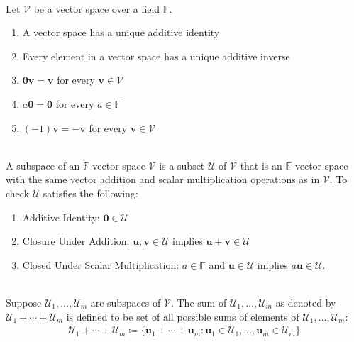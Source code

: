 \begin{remark} \\
Let $\mathcal{V}$ be a vector space over a field $\mathbb{F}$.
\begin{enumerate}[label=\roman*.]
\setlength{\itemsep}{0pt}
\item A vector space has a unique additive identity
\item Every element in a vector space has a unique additive inverse
\item $\mathbf{0} \mathbf{v} = \mathbf{v}$ for every $\mathbf{v} \in \mathcal{V}$
\item $a\mathbf{0} = \mathbf{0}$ for every $a \in \mathbb{F}$
\item $(-1)\mathbf{v} = -\mathbf{v}$ for every $\mathbf{v} \in \mathcal{V}$
\end{enumerate}
\end{remark}

\begin{definition} \\
A subspace of an $\mathbb{F}$-vector space $\mathcal{V}$ is a subset $\mathcal{U}$ of $\mathcal{V}$ that is an $\mathbb{F}$-vector space with the same vector addition and scalar multiplication operations as in $\mathcal{V}$. To check $\mathcal{U}$ satisfies the following:
\begin{enumerate}[label=\roman*.]
\setlength{\itemsep}{0pt}
\item Additive Identity: $\mathbf{0} \in \mathcal{U}$
\item Closure Under Addition: $\mathbf{u}, \mathbf{v} \in \mathcal{U}$ implies $\mathbf{u} + \mathbf{v} \in \mathcal{U}$
\item Closed Under Scalar Multiplication: $a \in \mathbb{F}$ and $\mathbf{u} \in \mathcal{U}$ implies $a \mathbf{u} \in \mathcal{U}$.
\end{enumerate}
\end{definition}

\begin{definition} \\
Suppose $\mathcal{U}_1, \ldots, \mathcal{U}_m$ are subspaces of $\mathcal{V}$. The sum of $\mathcal{U}_1, \ldots, \mathcal{U}_m$ as denoted by $\mathcal{U}_1 + \cdots + \mathcal{U}_m$ is defined to be set of all possible sums of elements of $\mathcal{U}_1, \ldots, \mathcal{U}_m$:
\begin{align*}
\mathcal{U}_1 + \cdots + \mathcal{U}_m \coloneqq \{ \mathbf{u}_1 + \cdots + \mathbf{u}_m : \mathbf{u}_1 \in \mathcal{U}_1, \ldots, \mathbf{u}_m \in \mathcal{U}_m \} \nonumber
\end{align*}
\end{definition}

